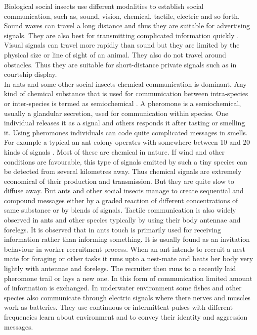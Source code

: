 Biological social insects use different modalities to establish social communication, such as, sound, vision, chemical, tactile,  electric and so forth.  Sound waves can travel a long distance and thus they are suitable for advertising signals. They are also best for transmitting complicated information quickly \cite{Slater1986}. Visual signals can travel more rapidly than sound but they are limited by the physical size or line of sight of an animal. They also do not travel around obstacles. Thus they are suitable for short-distance private signals such as in courtship display.\\
% 
In ants and some other social insects chemical communication is dominant. Any kind of chemical substance that is used for communication between intra-species or inter-species is termed as semiochemical \cite{Holldobler1990}. A pheromone is a semiochemical, usually a glandular secretion, used for communication within species. One individual releases it as a signal and others responds it after tasting or smelling it. Using pheromones individuals can code quite complicated messages in smells. For example a typical an ant colony operates with somewhere between 10 and 20 kinds of signals \cite{Holldobler1990}. Most of these are chemical in nature. If wind and other conditions are favourable,  this type of signals emitted by such a tiny species can be detected from several kilometres away. Thus chemical signals are extremely economical of their production and transmission. But they are quite slow to diffuse away. But ants and other social insects manage to create sequential and compound messages either by a graded reaction of different concentrations of same substance or by blends of signals.
Tactile communication is also widely observed in ants and other species typically by using their body antennae and forelegs. It is observed that in ants touch is primarily used  for receiving information rather than informing something. It is usually found as an invitation behaviour in worker recruitment process. When an ant intends to recruit a nest-mate for foraging or other tasks it runs upto a nest-mate and beats her body very lightly with  antennae and forelegs. The recruiter then runs to a recently laid pheromone trail or lays a new one. In this form of communication limited amount of information is exchanged. In underwater environment some fishes and other species also communicate through electric signals where there nerves and muscles work as batteries. They use continuous or intermittent pulses with  different frequencies learn about environment and to convey their identity and aggression messages.
